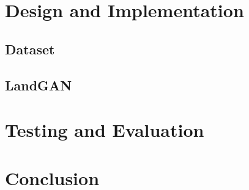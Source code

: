 \documentclass[a4paper]{report}
\begin{document}
\section{Design and Implementation}
\subsection{Dataset}
\subsection{LandGAN}
\section{Testing and Evaluation}
\section{Conclusion}
\end{document}

